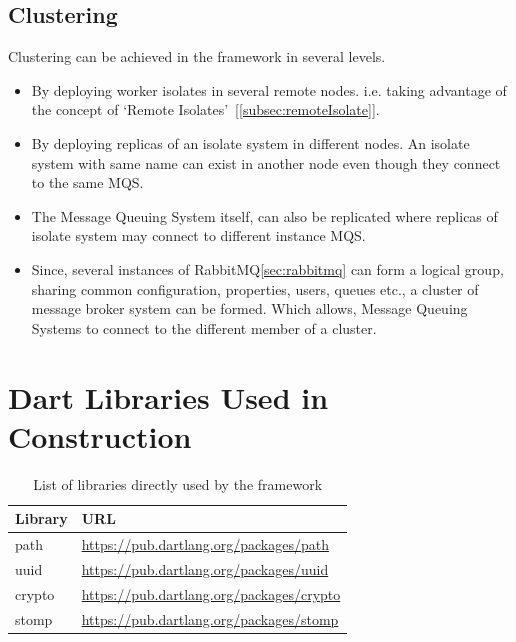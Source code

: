 \subsection{Clustering}
  Clustering can be achieved in the framework in several levels.
  \begin{itemize}
  \item By deploying worker isolates in several remote nodes. i.e. taking advantage of the concept of ‘Remote Isolates’~[\autoref{subsec:remoteIsolate}].
  \item By deploying replicas of an isolate system in different nodes. An isolate system with same name can exist in another node even though they connect to the same MQS.
  \item The Message Queuing System itself, can also be replicated where replicas of isolate system may connect to different instance MQS.
  \item Since, several instances of RabbitMQ\autoref{sec:rabbitmq} can form a logical group, sharing common configuration, properties, users, queues etc., a cluster of message broker system can be formed. Which allows, Message Queuing Systems to connect to the different member of a cluster.
  \end{itemize}

\section{Dart Libraries Used in Construction}
\begin{table}[htsb]
  \caption[libraries]{List of libraries directly used by the framework}\label{tab:libraries}
  \centering
  \begin{tabular}{l l}
    \toprule
      Library & URL \\
    \midrule
      path &  \url{https://pub.dartlang.org/packages/path}\\
      uuid &  \url{https://pub.dartlang.org/packages/uuid}\\
      crypto &  \url{https://pub.dartlang.org/packages/crypto}\\
      stomp &  \url{https://pub.dartlang.org/packages/stomp}\\
    \bottomrule
  \end{tabular}
\end{table}

